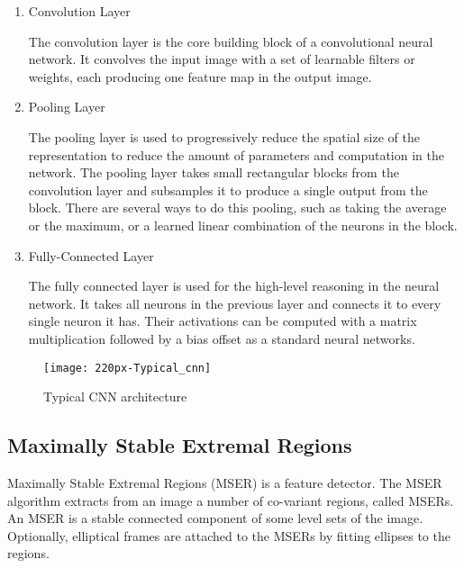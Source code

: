         \begin{enumerate}
        \item Convolution Layer
        
The convolution layer is the core building block of a convolutional neural network. It convolves the input image with a set of learnable filters or weights, each producing one feature map in the output image.

        \item Pooling Layer
        
The pooling layer is used to progressively reduce the spatial size of the representation to reduce the amount of parameters and computation in the network. The pooling layer takes small rectangular blocks from the convolution layer and subsamples it to produce a single output from the block. There are several ways to do this pooling, such as taking the average or the maximum, or a learned linear combination of the neurons in the block.

        \item Fully-Connected Layer
        
The fully connected layer is used for the high-level reasoning in the neural network. It takes all neurons in the previous layer and connects it to every single neuron it has. Their activations can be computed with a matrix multiplication followed by a bias offset as a standard neural networks.

\end{enumerate}

\begin{figure}[htb]
\centering
\texttt{[image: 220px-Typical\_cnn]}
\caption{Typical CNN architecture}
\end{figure}

    \subsection{ Maximally Stable Extremal Regions}
Maximally Stable Extremal Regions (MSER) is a feature detector. The MSER algorithm extracts from an image a number of co-variant regions, called MSERs. An MSER is a stable connected component of some level sets of the image. Optionally, elliptical frames are attached to the MSERs by fitting ellipses to the regions.
